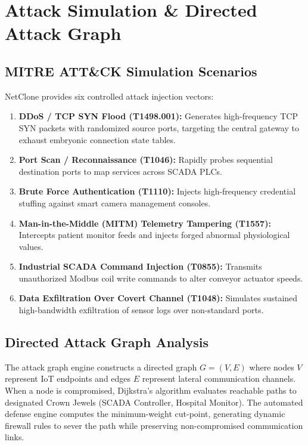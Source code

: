 \documentclass[12pt,a4paper]{report}
\begin{document}
\chapter{Attack Simulation \& Directed Attack Graph}

\section{MITRE ATT\&CK Simulation Scenarios}
NetClone provides six controlled attack injection vectors:
\begin{enumerate}
    \item \textbf{DDoS / TCP SYN Flood (T1498.001):} Generates high-frequency TCP SYN packets with randomized source ports, targeting the central gateway to exhaust embryonic connection state tables.
    \item \textbf{Port Scan / Reconnaissance (T1046):} Rapidly probes sequential destination ports to map services across SCADA PLCs.
    \item \textbf{Brute Force Authentication (T1110):} Injects high-frequency credential stuffing against smart camera management consoles.
    \item \textbf{Man-in-the-Middle (MITM) Telemetry Tampering (T1557):} Intercepts patient monitor feeds and injects forged abnormal physiological values.
    \item \textbf{Industrial SCADA Command Injection (T0855):} Transmits unauthorized Modbus coil write commands to alter conveyor actuator speeds.
    \item \textbf{Data Exfiltration Over Covert Channel (T1048):} Simulates sustained high-bandwidth exfiltration of sensor logs over non-standard ports.
\end{enumerate}

\section{Directed Attack Graph Analysis}
The attack graph engine constructs a directed graph $G = (V, E)$ where nodes $V$ represent IoT endpoints and edges $E$ represent lateral communication channels. When a node is compromised, Dijkstra's algorithm evaluates reachable paths to designated Crown Jewels (SCADA Controller, Hospital Monitor). The automated defense engine computes the minimum-weight cut-point, generating dynamic firewall rules to sever the path while preserving non-compromised communication links.
\end{document}
